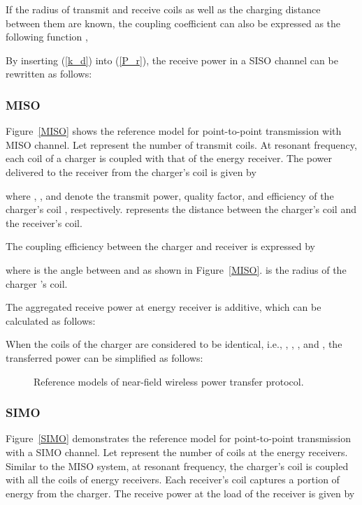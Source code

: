 \documentclass[twocolumn,10pt]{IEEEtran}
\begin{document}
 
If the radius of transmit and receive coils as well as the charging distance between them are known, the coupling coefficient can also be expressed as the following function \cite{I.2011Agbinya,I.2013Agbinya}, 


By inserting (\ref{k_d}) into (\ref{P_r}), the receive power in a SISO channel can be rewritten as follows:



 
\subsubsection{MISO}


Figure~\ref{MISO} shows the reference model for point-to-point transmission with MISO channel. 
Let  represent the number of transmit coils. At resonant frequency, each coil of a charger is coupled with that of the energy receiver. The power delivered to the receiver from the charger's coil  is given by~\cite{H.2013Nguyen}

where , , and  denote the transmit power, quality factor, and efficiency of the charger's coil , respectively.  represents the distance between the charger's coil  and the receiver's coil.
  
  
The coupling efficiency between the charger and receiver is expressed by~\cite{H.2013Nguyen}

where  is the angle between  and  as shown in Figure~\ref{MISO}.  is the radius of the charger 's coil. 

The aggregated receive power at energy receiver is additive, which can be calculated as follows: 



When the coils of the charger are considered to be identical, i.e., , , , and , the transferred power can be simplified as follows:



 
\begin{figure*} 
\centering
{}  
 \centering
  \centering
\caption{Reference models of near-field wireless power transfer protocol.} 
\label{WPT}
\end{figure*}  

\subsubsection{SIMO}
Figure~\ref{SIMO} demonstrates the reference model for point-to-point transmission with a SIMO channel. Let  represent the number of coils at the energy receivers. Similar to the MISO system, at resonant frequency, the charger's coil is coupled with all the coils of energy receivers. Each receiver's coil captures a portion of energy from the charger. The receive power at the load of the receiver  is given by
\end{document}
